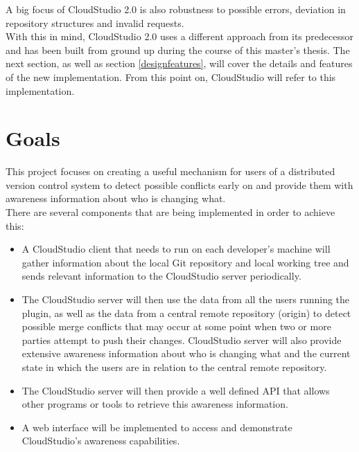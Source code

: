 A big focus of CloudStudio 2.0 is also robustness to possible errors, deviation in repository structures and invalid requests. \\

With this in mind, CloudStudio 2.0 uses a different approach from its predecessor and has been built from ground up during the course of this master's thesis. The next section, as well as section \ref{designfeatures}, will cover the details and features of the new implementation. From this point on, CloudStudio will refer to this implementation.







\section{Goals}




This project focuses on creating a useful mechanism for users of a distributed version control system to detect possible conflicts early on and provide them with awareness information about who is changing what. \\

There are several components that are being implemented in order to achieve this:


\begin{itemize}

\item A CloudStudio client that needs to run on each developer's machine will gather information about the local Git repository and local working tree and sends relevant information to the CloudStudio server periodically.
\item The CloudStudio server will then use the data from all the users running the plugin, as well as the data from a central remote repository (origin) to detect possible merge conflicts that may occur at some point when two or more parties attempt to push their changes. CloudStudio server will also provide extensive awareness information about who is changing what and the current state in which the users are in relation to the central remote repository.
\item The CloudStudio server will then provide a well defined API that allows other programs or tools to retrieve this awareness information.
\item A web interface will be implemented to access and demonstrate CloudStudio's awareness capabilities.

\end{itemize}

